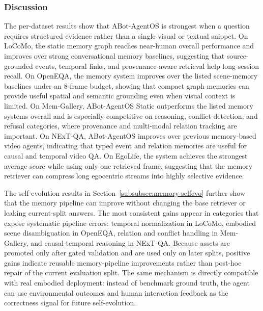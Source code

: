 \FloatBarrier

\subsubsection{Discussion}
\label{subsubsec:memory-discussion}

The per-dataset results show that ABot-AgentOS is strongest when a question requires structured evidence rather than a single visual or textual snippet.
On LoCoMo, the static memory graph reaches near-human overall performance and improves over strong conversational memory baselines, suggesting that source-grounded events, temporal links, and provenance-aware retrieval help long-session recall.
On OpenEQA, the memory system improves over the listed scene-memory baselines under an 8-frame budget, showing that compact graph memories can provide useful spatial and semantic grounding even when visual context is limited.
On Mem-Gallery, ABot-AgentOS Static outperforms the listed memory systems overall and is especially competitive on reasoning, conflict detection, and refusal categories, where provenance and multi-modal relation tracking are important.
On NExT-QA, ABot-AgentOS improves over previous memory-based video agents, indicating that typed event and relation memories are useful for causal and temporal video QA.
On EgoLife, the system achieves the strongest average score while using only one retrieved frame, suggesting that the memory retriever can compress long egocentric streams into highly selective evidence.

The self-evolution results in Section~\ref{subsubsec:memory-selfevo} further show that the memory pipeline can improve without changing the base retriever or leaking current-split answers.
The most consistent gains appear in categories that expose systematic pipeline errors: temporal normalization in LoCoMo, embodied scene disambiguation in OpenEQA, relation and conflict handling in Mem-Gallery, and causal-temporal reasoning in NExT-QA.
Because assets are promoted only after gated validation and are used only on later splits, positive gains indicate reusable memory-pipeline improvements rather than post-hoc repair of the current evaluation split.
The same mechanism is directly compatible with real embodied deployment: instead of benchmark ground truth, the agent can use environmental outcomes and human interaction feedback as the correctness signal for future self-evolution.